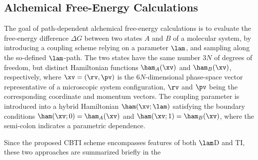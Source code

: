 \subsection{Alchemical Free-Energy Calculations}



The goal of path-dependent alchemical free-energy calculations is
to evaluate the free-energy difference $\Delta G$
between two states $A$ and $B$ of a molecular system,
by introducing a coupling scheme relying on a parameter $\lam$,
and sampling along the so-defined $\lam$-path.
%
The two states have the same number $3N$ of degrees of 
freedom, but distinct Hamiltonian functions $\ham_A(\xv)$ and $\ham_B(\xv)$,
respectively, where $\xv = (\rv,\pv)$ is the $6N$-dimensional
phase-space vector representative of a microscopic system configuration, $\rv$ 
and $\pv$ being the corresponding coordinate and momentum vectors.
%
The coupling parameter is introduced into a hybrid Hamiltonian 
$\ham(\xv;\lam)$ 
satisfying the boundary conditions
$\ham(\xv;0)=\ham_A(\xv)$ and $\ham(\xv;1)=\ham_B(\xv)$,
where the semi-colon indicates a parametric dependence.
%
%
%
%



Since the proposed CBTI scheme encompasses features of both $\lam$D and TI,
these two approaches are summarized briefly in the 



